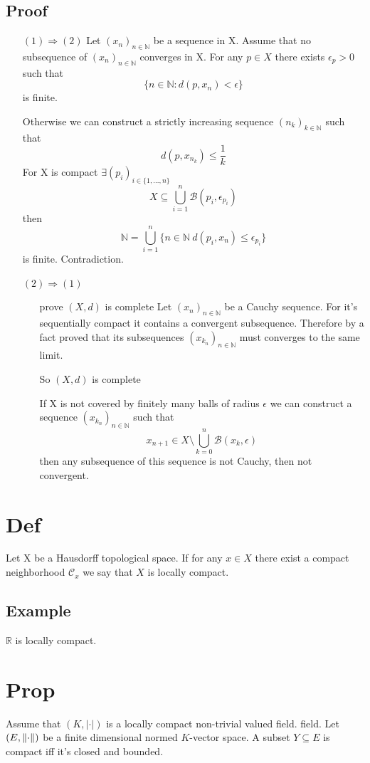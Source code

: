 \documentclass{book}
\newcommand{\abs}[1]{\left\lvert #1 \right\rvert}
\begin{document}
\subsection*{Proof}
\begin{itemize}
    \item[$(1)\Rightarrow(2)$] Let $(x_n)_{n\in \mathbb{N}}$ be a sequence in X. Assume that no subsequence of  $(x_n)_{n\in \mathbb{N}}$ converges in X.
    For any $p\in X$ there exists $\epsilon_p>0$ such that 
    $$\{n\in \mathbb{N}:d(p,x_n)<\epsilon\}$$ is finite. 
    
    Otherwise we can construct a strictly increasing sequence $({n_k})_{k\in \mathbb{N}}$ such that 
    $$d(p,x_{n_k})\leq\frac{1}{k}$$
    For X is compact $\exists (p_i)_{i\in \{1,...,n\}}$
    $$X\subseteq\bigcup\limits_{i=1}^n\mathcal{B}(p_i,\epsilon_{p_i})$$
    then $$\mathbb{N}=\bigcup\limits_{i=1}^n\{n\in \mathbb{N}\ d(p_i,x_{n})\leq\epsilon_{p_i}\}$$ is finite. Contradiction.
    \item [$(2)\Rightarrow(1)$]
    \item[]
    \begin{itemize}
        \item[prove $(X,d)$ is complete]
        Let $(x_n)_{n\in \mathbb{N}}$ be a Cauchy sequence. For it's sequentially compact it contains a convergent subsequence. Therefore by a fact proved that its subsequences $(x_{k_n})_{n\in \mathbb{N}}$ must converges to the same limit.

        So $(X,d)$ is complete
        \item[] If X is not covered by finitely many balls of radius $\epsilon$ we can construct a sequence $(x_{k_n})_{n\in \mathbb{N}}$ such that $$x_{n+1}\in X\setminus\bigcup\limits_{k=0}^n\mathcal{B}(x_k,\epsilon)$$ then any subsequence of this sequence is not Cauchy, then not convergent.
    \end{itemize}
\end{itemize}
\section{Def}
Let X be a Hausdorff topological space. If for any $x\in X$ there exist a compact neighborhood $\mathcal{C}_x$ we say that $X$ is locally compact.
\subsection*{Example}$\mathbb{R}$ is locally compact.
\section{Prop}
Assume that $(K,\abs\cdot)$ is a locally compact non-trivial valued field.
field. Let $(E,\left\lVert \cdot \right\rVert)$ be a finite dimensional normed $K$-vector space. A subset $Y\subseteq E$ is compact iff it's closed and bounded.
\end{document}
